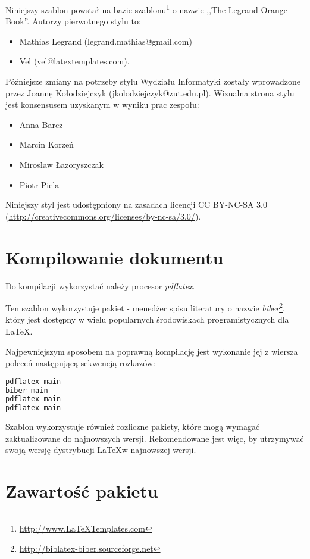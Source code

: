 Niniejszy szablon powstał na bazie szablonu\footnote{\url{http://www.LaTeXTemplates.com}} o nazwie ,,The Legrand Orange Book''.
Autorzy pierwotnego stylu to:
\begin{itemize}
    \item Mathias Legrand (legrand.mathias@gmail.com)
    \item Vel (vel@latextemplates.com).
\end{itemize}

Późniejsze zmiany na potrzeby stylu Wydziału Informatyki zostały wprowadzone przez Joannę Kołodziejczyk (jkolodziejczyk@zut.edu.pl). Wizualna strona stylu jest konsensusem uzyskanym w wyniku prac zespołu:
\begin{itemize}
    \item Anna Barcz
    \item Marcin Korzeń
    \item Mirosław Łazoryszczak
    \item Piotr Piela
\end{itemize}

Niniejszy styl jest udostępniony na zasadach licencji CC BY-NC-SA 3.0 ({\url{http://creativecommons.org/licenses/by-nc-sa/3.0/}}).


\section{Kompilowanie dokumentu}

Do kompilacji wykorzystać należy procesor {\em pdflatex}.

Ten szablon wykorzystuje pakiet - menedżer spisu literatury o nazwie {\em biber}\footnote{ \url{http://biblatex-biber.sourceforge.net}}, który jest dostępny w wielu popularnych środowiskach programistycznych dla \LaTeX.

Najpewniejszym sposobem na poprawną kompilację jest wykonanie jej z wiersza poleceń następującą sekwencją rozkazów:

\begin{lstlisting}[language=bash, caption=Skrypt kompilujący, label=alg:1]
pdflatex main
biber main
pdflatex main
pdflatex main

\end{lstlisting}

Szablon wykorzystuje również rozliczne pakiety, które mogą wymagać
zaktualizowane do najnowszych wersji. Rekomendowane jest więc, by utrzymywać swoją wersję dystrybucji \LaTeX w najnowszej wersji.


\section{Zawartość pakietu}

